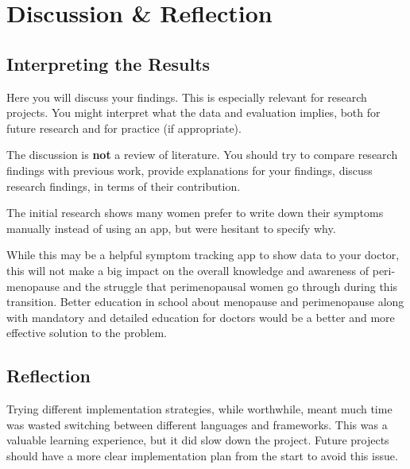 \section{Discussion \& Reflection}

\subsection{Interpreting the Results}

Here you will discuss your findings. This is especially relevant for research projects. You might 
 interpret what the data and evaluation implies, both for future research and for practice (if appropriate). 
 
 The discussion is \textbf{not} a review of literature. You should try to compare research findings with previous work,
provide  explanations for your findings,
discuss  research findings, in terms of their contribution.


The initial research shows many women prefer to write down their symptoms manually instead of using an app, but were hesitant to specify why. 

While this may be a helpful symptom tracking app to show data to your doctor, this will not make a big impact on the overall knowledge and awareness of peri-menopause and the struggle that perimenopausal women go through during this transition. Better education in school about menopause and perimenopause along with mandatory and detailed education for doctors would be a better and more effective solution to the problem.

\subsection{Reflection}
Trying different implementation strategies, while worthwhile, meant much time was wasted switching between different languages and frameworks. This was a valuable learning experience, but it did slow down the project. Future projects should have a more clear implementation plan from the start to avoid this issue.

